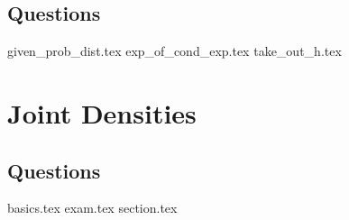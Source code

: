 \documentclass{exam}
\begin{document}
\subsection{Questions}
\begin{questions}
{given_prob_dist.tex}
{exp_of_cond_exp.tex}
{take_out_h.tex}
\end{questions}


\section{Joint Densities}
\subsection{Questions}
\begin{questions}
	{basics.tex}
	{exam.tex}
	{section.tex}
\end{questions}
\end{document}
